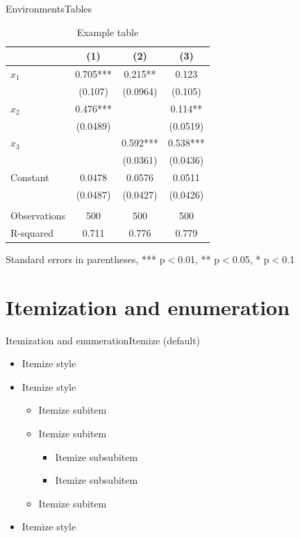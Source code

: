 \documentclass[aspectratio=169, 11pt]{beamer}
\begin{document}
\begin{frame}{Environments}{Tables}
\begin{table}
	\centering
	\scriptsize
	\caption{Example table}
	\begin{tabular}{lccc} \hline
	 & (1) & (2) & (3) \\ \hline
	$x_1$ & 0.705*** & 0.215** & 0.123 \\
	 & (0.107) & (0.0964) & (0.105) \\
	$x_2$ & 0.476*** &  & 0.114** \\
	 & (0.0489) &  & (0.0519) \\
	$x_3$ &  & 0.592*** & 0.538*** \\
	 &  & (0.0361) & (0.0436) \\
	Constant & 0.0478 & 0.0576 & 0.0511 \\
	 & (0.0487) & (0.0427) & (0.0426) \\
	 &  &  &  \\
	Observations & 500 & 500 & 500 \\
	 R-squared & 0.711 & 0.776 & 0.779 \\ \hline
	\end{tabular}
	
	\flushleft\scriptsize
	Standard errors in parentheses, *** p$<$0.01, ** p$<$0.05, * p$<$0.1
\end{table}
\end{frame}


\section{Itemization and enumeration} \label{sec:items}
\begin{frame}{Itemization and enumeration}{Itemize (default)}
\begin{itemize}
	\item Itemize style
	\item Itemize style
	\begin{itemize}
		\item Itemize subitem
		\item Itemize subitem
			\begin{itemize}
				\item Itemize subsubitem
				\item Itemize subsubitem
			\end{itemize}
		\item Itemize subitem	
	\end{itemize}
	\item Itemize style
\end{itemize}
\end{frame}
\end{document}
